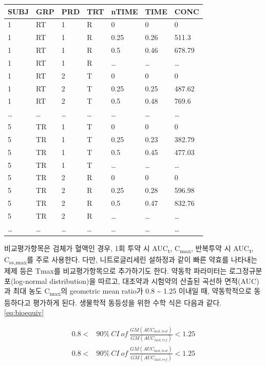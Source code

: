 \documentclass[
  11pt,
  krantz2, a4paper, twoside]{krantz}
\theoremstyle{definition}
\theoremstyle{definition}
\theoremstyle{definition}
\theoremstyle{definition}
\theoremstyle{remark}
\begin{document}
\begin{longtable}[]{@{}lllllll@{}}
\toprule
SUBJ & GRP & PRD & TRT & nTIME & TIME & CONC \\
\midrule
\endhead
1 & RT & 1 & R & 0 & 0 & 0 \\
1 & RT & 1 & R & 0.25 & 0.26 & 511.3 \\
1 & RT & 1 & R & 0.5 & 0.46 & 678.79 \\
1 & RT & 1 & R & \ldots{} & \ldots{} & \ldots{} \\
1 & RT & 2 & T & 0 & 0 & 0 \\
1 & RT & 2 & T & 0.25 & 0.25 & 487.62 \\
1 & RT & 2 & T & 0.5 & 0.48 & 769.6 \\
\ldots{} & \ldots{} & \ldots{} & \ldots{} & \ldots{} & \ldots{} & \ldots{} \\
5 & TR & 1 & T & 0 & 0 & 0 \\
5 & TR & 1 & T & 0.25 & 0.23 & 382.79 \\
5 & TR & 1 & T & 0.5 & 0.45 & 477.03 \\
5 & TR & 1 & T & \ldots{} & \ldots{} & \ldots{} \\
5 & TR & 2 & R & 0 & 0 & 0 \\
5 & TR & 2 & R & 0.25 & 0.28 & 596.98 \\
5 & TR & 2 & R & 0.5 & 0.47 & 832.76 \\
5 & TR & 2 & R & \ldots{} & \ldots{} & \ldots{} \\
\ldots{} & \ldots{} & \ldots{} & \ldots{} & \ldots{} & \ldots{} & \ldots{} \\
\bottomrule
\end{longtable}

비교평가항목은 검체가 혈액인 경우, 1회 투약 시 AUC\textsubscript{t}, C\textsubscript{max}, 반복투약 시 AUC\textsubscript{τ}, C\textsubscript{ss,max}를 주로 사용한다. 다만, 니트로글리세린 설하정과 같이 빠른 약효를 나타내는 제제 등은 Tmax를 비교평가항목으로 추가하기도 한다. 약동학 파라미터는 로그정규분포(log-normal distribution)을 따르고, 대조약과 시험약의 산출된 곡선하 면적(AUC)과 최대 농도 C\textsubscript{max}의 geometric mean ratio가 0.8 \textasciitilde{} 1.25 이내일 때, 약동학적으로 동등하다고 평가하게 된다.
생물학적 동등성을 위한 수학 식은 다음과 같다. \eqref{eq:bioequiv}

\begin{equation}
\begin{split}
  0.8 < & 90\%\ CI\ of\ \frac{GM(AUC_{last, test})}{GM(AUC_{last, ref})} < 1.25 \\
  0.8 < & 90\%\ CI\ of\ \frac{GM(AUC_{last, test})}{GM(AUC_{last, ref})} < 1.25 
\end{split}
\label{eq:bioequiv}
\end{equation}
\end{document}
